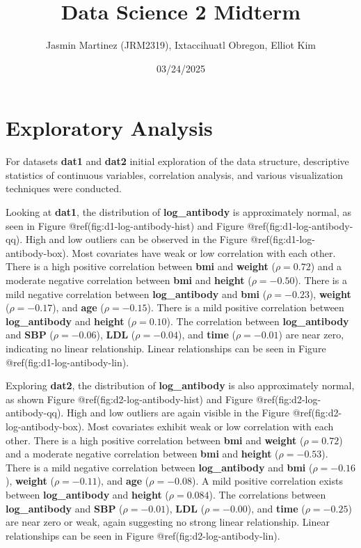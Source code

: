 \documentclass[
]{article}
\title{Data Science 2 Midterm}
\author{Jasmin Martinez (JRM2319), Ixtaccihuatl Obregon, Elliot Kim}
\date{03/24/2025}
\begin{document}
\maketitle

\section{Exploratory Analysis}\label{exploratory-analysis}

For datasets \textbf{dat1} and \textbf{dat2} initial exploration of the
data structure, descriptive statistics of continuous variables,
correlation analysis, and various visualization techniques were
conducted.

Looking at \textbf{dat1}, the distribution of \textbf{log\_antibody} is
approximately normal, as seen in Figure @ref(fig:d1-log-antibody-hist)
and Figure @ref(fig:d1-log-antibody-qq). High and low outliers can be
observed in the Figure @ref(fig:d1-log-antibody-box). Most covariates
have weak or low correlation with each other. There is a high positive
correlation between \textbf{bmi} and \textbf{weight} (\(\rho = 0.72\))
and a moderate negative correlation between \textbf{bmi} and
\textbf{height} (\(\rho = -0.50\)). There is a mild negative correlation
between \textbf{log\_antibody} and \textbf{bmi} (\(\rho = -0.23\)),
\textbf{weight} (\(\rho = -0.17\)), and \textbf{age} (\(\rho = -0.15\)).
There is a mild positive correlation between \textbf{log\_antibody} and
\textbf{height} (\(\rho = 0.10\)). The correlation between
\textbf{log\_antibody} and \textbf{SBP} (\(\rho = -0.06\)), \textbf{LDL}
(\(\rho = -0.04\)), and \textbf{time} (\(\rho = -0.01\)) are near zero,
indicating no linear relationship. Linear relationships can be seen in
Figure @ref(fig:d1-log-antibody-lin).

Exploring \textbf{dat2}, the distribution of \textbf{log\_antibody} is
also approximately normal, as shown Figure
@ref(fig:d2-log-antibody-hist) and Figure @ref(fig:d2-log-antibody-qq).
High and low outliers are again visible in the Figure
@ref(fig:d2-log-antibody-box). Most covariates exhibit weak or low
correlation with each other. There is a high positive correlation
between \textbf{bmi} and \textbf{weight} (\(\rho = 0.72\)) and a
moderate negative correlation between \textbf{bmi} and \textbf{height}
(\(\rho = -0.53\)). There is a mild negative correlation between
\textbf{log\_antibody} and \textbf{bmi} (\(\rho = -0.16\)),
\textbf{weight} (\(\rho = -0.11\)), and \textbf{age} (\(\rho = -0.08\)).
A mild positive correlation exists between \textbf{log\_antibody} and
\textbf{height} (\(\rho = 0.084\)). The correlations between
\textbf{log\_antibody} and \textbf{SBP} (\(\rho = -0.01\)), \textbf{LDL}
(\(\rho = -0.00\)), and \textbf{time} (\(\rho = -0.25\)) are near zero
or weak, again suggesting no strong linear relationship. Linear
relationships can be seen in Figure @ref(fig:d2-log-antibody-lin).
\end{document}
